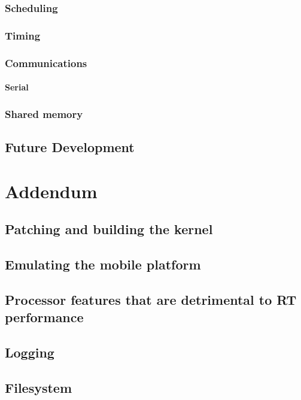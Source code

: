 \documentclass[a4paper,12pt]{report}
\begin{document}
\subsection{Scheduling}
\subsection{Timing}
\subsection{Communications}
\subsubsection{Serial}
\subsection{Shared memory}
\section{Future Development}

\newpage
\chapter{Addendum}
\section{Patching and building the kernel}
\section{Emulating the mobile platform}
\section{Processor features that are detrimental to RT performance}
\section{Logging}
\section{Filesystem}


\end{document}
